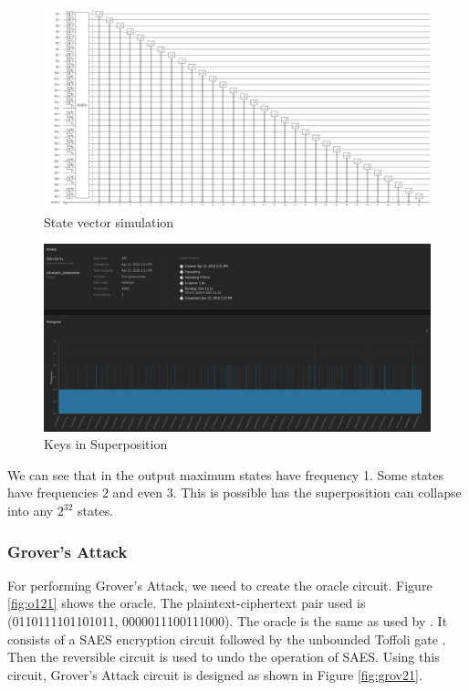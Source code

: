 \documentclass[preprint]{transcrypto}
\begin{document}
\begin{figure}[h!]
    \centering
    \includegraphics[width=1.1\linewidth]{saes21/expt2.pdf}
    \caption{State vector simulation}
    \label{fig:expt2}
\end{figure}


\begin{figure}[h!]
    \centering
    \includegraphics[width=\linewidth]{saes21/statevector.png}
    \caption{Keys in Superposition}
    \label{fig:expt2res}
\end{figure}

We can see that in the output maximum states have frequency 1. Some states have frequencies 2 and even 3. This is possible has the superposition can collapse into any $2^{32}$ states.


\subsubsection{Grover's Attack}
For performing Grover's Attack, we need to create the oracle circuit. Figure \ref{fig:o121} shows the oracle. The plaintext-ciphertext pair used is (0110111101101011, 0000011100111000). The oracle is the same as used by \cite{Almazrooie}. It consists of a SAES encryption circuit followed by the unbounded Toffoli gate \cite{mcmt}. Then the reversible circuit is used to undo the operation of SAES. Using this circuit, Grover's Attack circuit is designed as shown in Figure \ref{fig:grov21}.
\end{document}
